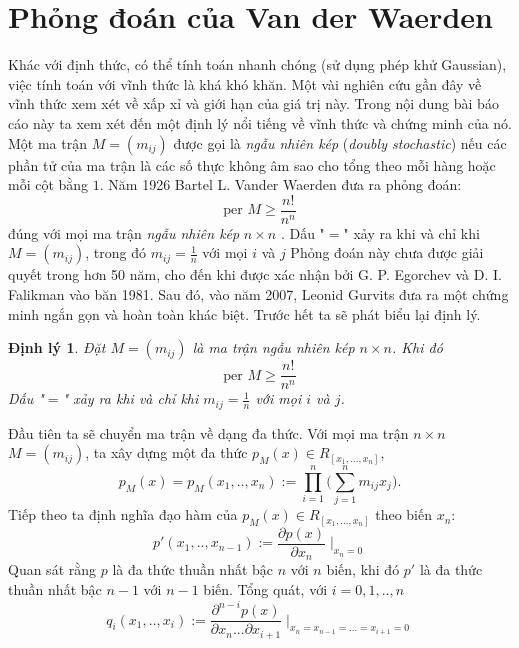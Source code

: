 \documentclass[a4paper, 12pt]{report}
\newtheorem{theoremnum}{Định lý } %
\begin{document}
\section{Phỏng đoán của Van der Waerden}
Khác với định thức, có thể tính toán nhanh chóng (sử dụng phép khử Gaussian), việc tính toán với vĩnh thức là khá khó khăn. Một vài nghiên cứu gần đây về vĩnh thức xem xét về xấp xỉ và giới hạn của giá trị này. Trong nội dung bài báo cáo này ta xem xét đến một định lý nổi tiếng về vĩnh thức và chứng minh của nó. Một ma trận $M=(m_{ij})$ được gọi là \textit{ngẫu nhiên kép} (\textit{doubly stochastic}) nếu các phần tử của ma trận là các số thực không âm sao cho tổng theo mỗi hàng hoặc mỗi cột bằng $1$. Năm 1926 Bartel L. Vander Waerden đưa ra phỏng đoán: 
\begin{equation*}
\textrm{per } M \geq \frac{n!}{n^n}
\end{equation*}
đúng với mọi ma trận \textit{ngẫu nhiên kép} $n \times n $ . Dấu "$=$"  xảy ra khi và chỉ khi $M=(m_{ij})$, trong đó $m_{ij} = \frac{1}{n}$ với mọi $i$ và $j$
Phỏng đoán này chưa được giải quyết trong hơn 50 năm, cho đến khi được xác nhận bởi G. P. Egorchev và D. I. Falikman vào băn 1981. Sau đó, vào năm 2007, Leonid Gurvits đưa ra một chứng minh ngắn gọn và hoàn toàn khác biệt. Trước hết ta sẽ phát biểu lại định lý.
\begin{theoremnum}
Đặt $M=(m_{ij})$ là ma trận \textit{ngẫu nhiên kép} $n \times n $. Khi đó
\begin{equation}
\textrm{per } M \geq \frac{n!}{n^n} \label{eqPer}
\end{equation}
Dấu "$=$" xảy ra khi và chỉ khi  $m_{ij} = \frac{1}{n}$ với mọi $i$ và $j$.
\end{theoremnum}
Đầu tiên ta sẽ chuyển ma trận về dạng đa thức. Với mọi ma trận $n  \times n$ $M = (m_{ij}) $, ta xây dựng một đa thức $p_M(x) \in R_{[x_1,...,x_n]} $, 
\begin{equation*}
	p_M(x) = p_M(x_1,..,x_n) := \displaystyle \prod_{i=1}^{n} \Big( \displaystyle \sum_{j=1}^{n} m_{ij}x_j \Big).
\end{equation*}
Tiếp theo ta định nghĩa đạo hàm của $p_M(x) \in R_{[x_1,...,x_n]} $  theo biến $x_n$:
\begin{equation*}
	 p'(x_1,..,x_{n-1}) := \frac{\partial p(x)}{\partial x_n}\mid _{x_n = 0}
\end{equation*}
Quan sát rằng $p$ là đa thức thuần nhất bậc $n$ với $n$ biến, khi đó $p'$ là đa thức thuần nhất bậc $n-1$ với $n-1$ biến. Tổng quát, với $i=0,1,..,n$
\begin{equation*}
	 q_i(x_1,..,x_{i}) := \frac{\partial^{n-i} p(x)}{\partial x_n...\partial x_{i+1}}\mid _{x_n = x_{n-1} = ... = x_{i+1} = 0}
\end{equation*}
\end{document}
